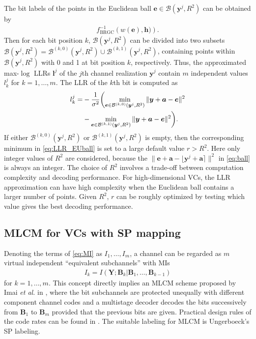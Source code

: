 \documentclass[journal]{IEEEtran}
\newcommand{\B}{\mathcal{B}}
\newcommand{\ba}{\boldsymbol{a}}
\newcommand{\be}{\boldsymbol{e}}
\newcommand{\bh}{\boldsymbol{h}}
\newcommand{\bl}{\boldsymbol{l}}
\newcommand{\by}{\boldsymbol{y}}
\newcommand{\bB}{\boldsymbol{B}}
\newcommand{\bY}{\boldsymbol{Y}}
\begin{document}
The bit labels of the points in the Euclidean ball ${\be\in\B(\by^j,R^2)}$ can be obtained by 
\begin{align}
    f^{-1}_{\text{BRGC}}\left(w(\be),\bh)\right).
\end{align}
Then for each bit position $k$, $\B(\by^j,R^2)$ can be divided into two subsets $\B(\by^j,R^2)=\B^{(k,0)}(\by^j,R^2)\cup\B^{(k,1)}(\by^j,R^2)$, containing points within $\B(\by^j,R^2)$ with 0 and 1 at bit position $k$, respectively.
Thus, the approximated max-$\log$ LLRs $\bl^j$ of the $j$th channel realization $\by^j$ contain $m$ independent values $l_k^j$ for $k=1,\ldots,m$. The LLR of the $k$th bit is computed as
\begin{align}\label{eq:LLR_EUball}
    l_k^j=&-\frac{1}{\sigma^2}\biggl(\min_{\be\in\B^{(k,0)}(\by^j,R^2)}\|\by+\ba-\be\|^2 \notag \\&- \min_{\be\in\B^{(k,1)}(\by^j,R^2)}\|\by+\ba-\be\|^2\biggr).
\end{align}
If either $\B^{(k,0)}(\by^j,R^2)$ or $\B^{(k,1)}(\by^j,R^2)$ is empty, then the corresponding minimum in \eqref{eq:LLR_EUball} is set to a large default value $r>R^2$. Here only integer values of $R^2$ are considered, because the ${\| \be+\ba-\lfloor \by^j+\ba \rceil \|^2}$ in \eqref{eq:ball} is always an integer. The choice of $R^2$ involves a trade-off between computation complexity and decoding performance. For high-dimensional VCs, the LLR approximation can have high complexity when the Euclidean ball contains a larger number of points. Given $R^2$, $r$ can be roughly optimized by testing which value gives the best decoding performance.

\subsection{MLCM for VCs with SP mapping}
Denoting the terms of \eqref{eq:MI} as $I_1,\ldots,I_m$, a channel can be regarded as $m$ virtual independent ``equivalent subchannels'' with MIs
\begin{align}\label{eq:Ii}
    I_k=I(\bY;\bB_k|\bB_1,\dots,\bB_{k-1})
\end{align}
for $k=1,\ldots,m$. This concept directly implies an MLCM scheme proposed by Imai \emph{et al.} in \cite{imai77}, where the bit subchannels are protected unequally with different component channel codes and a multistage decoder decodes the bits successively from $\bB_1$ to $\bB_m$ provided that the previous bits are given. Practical design rules of the code rates can be found in \cite{wachsmann99}. The suitable labeling for MLCM is Ungerboeck's SP labeling. 
\end{document}
